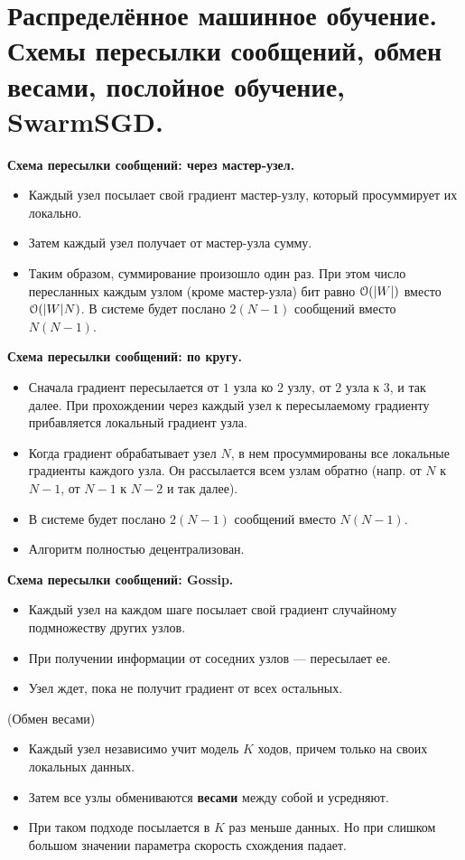 \section{Распределённое машинное обучение. Схемы пересылки сообщений, обмен
  весами, послойное обучение, SwarmSGD.}

\textbf{Схема пересылки сообщений: через мастер-узел.}
\begin{itemize}
  \item Каждый узел посылает свой градиент мастер-узлу, который просуммирует их
    локально.
  \item Затем каждый узел получает от мастер-узла сумму.
  \item Таким образом, суммирование произошло один раз. При этом число
    пересланных каждым узлом (кроме мастер-узла) бит равно
    $\mathcal{O}(\lvert W\rvert)$ вместо $\mathcal{O}(\lvert W\rvert N)$. В системе будет
    послано $2  (N - 1)$ сообщений вместо $N (N - 1)$.
\end{itemize}

\textbf{Схема пересылки сообщений: по кругу.}
\begin{itemize}
  \item Сначала градиент пересылается от $1$ узла ко $2$ узлу, от $2$ узла
    к $3$, и так далее. При прохождении через каждый узел к пересылаемому
    градиенту прибавляется локальный градиент узла.
  \item Когда градиент обрабатывает узел $N$, в нем просуммированы все локальные
    градиенты каждого узла. Он рассылается всем узлам обратно (напр. от $N$ к
    $N - 1$, от $N - 1$ к $N - 2$ и так далее).
  \item В системе будет послано $2  (N - 1)$ сообщений вместо $N (N - 1)$.
  \item Алгоритм полностью децентрализован.
\end{itemize}

\textbf{Схема пересылки сообщений: Gossip.}
\begin{itemize}
  \item Каждый узел на каждом шаге посылает свой градиент случайному
    подмножеству других узлов.
  \item При получении информации от соседних узлов --- пересылает ее.
  \item Узел ждет, пока не получит градиент от всех остальных.
\end{itemize}

\begin{algorithm}(Обмен весами)
  \begin{itemize}
    \item Каждый узел независимо учит модель $K$ ходов, причем только на своих
      локальных данных.
    \item Затем все узлы обмениваются \textbf{весами} между собой и усредняют.
    \item При таком подходе посылается в $K$ раз меньше данных. Но при слишком
      большом значении параметра скорость схождения падает.
  \end{itemize}
\end{algorithm}

